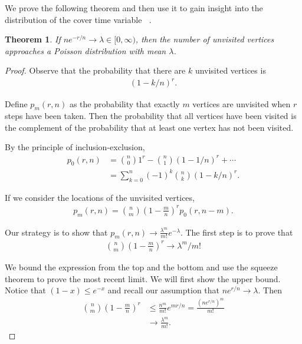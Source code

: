 \documentclass[12pt]{article}
\newtheorem{theorem}{Theorem}
\theoremstyle{definition}
\DeclareMathOperator{\cov}{\uptau_\textrm{cov}}  %
\begin{document}
We prove the following theorem and then use it to gain insight into
the distribution of the cover time variable $\cov$.
\begin{theorem}\label{thm:pois}
If $ne^{-r/n} \rightarrow \lambda \in [0, \infty)$, then the number of unvisited
vertices approaches a Poisson distribution with mean $\lambda$.
\end{theorem}

\begin{proof}
Observe that the probability that there are $k$ unvisited vertices is
\begin{align}
(1-k/n)^r \nonumber.
\end{align}

Define $p_m(r,n)$ as the probability that exactly $m$ vertices are unvisited
when $r$ steps have been taken.
Then the probability that all vertices have been visited is the complement
of the probability that at least one vertex has not been visited.

By the principle of inclusion-exclusion,
\begin{align}
p_0(r,n) &= {n \choose 0} 1^r - {n \choose 1} (1-1/n)^r + \cdots \nonumber\\
&= \sum_{k=0}^n (-1)^k {n \choose k} (1-k/n)^r. \label{eqn:p0}
\end{align}

If we consider the locations of the unvisited vertices,
\begin{align}
p_m(r,n) = {n \choose m} \left(1-\frac{m}{n}\right)^r p_0(r, n-m). \nonumber
\end{align}

Our strategy is to show that $p_m(r,n) \rightarrow \frac{\lambda^m}{m!}e^{-\lambda}$.
The first step is to prove that
\begin{align}
{n \choose m} \left(1-\frac{m}{n}\right)^r \rightarrow \lambda ^m /m! \label{eqn:lim}
\end{align}

We bound the expression from the top and the bottom and use the squeeze
theorem to prove the most recent limit.
We will first show the upper bound.
Notice that $(1-x) \leq e^{-x}$ and recall our assumption that
$ne^{r/n} \rightarrow \lambda$.
Then
\begin{align}
{n \choose m} \left(1-\frac{m}{n}\right)^r &\leq \frac{n^m}{m!} e^{mr/n} 
= \frac{(n e^{r/n})^m} {m!} \nonumber \\
&\rightarrow \frac{\lambda ^m} {m!}. \nonumber
\end{align}


\end{proof}
\end{document}
